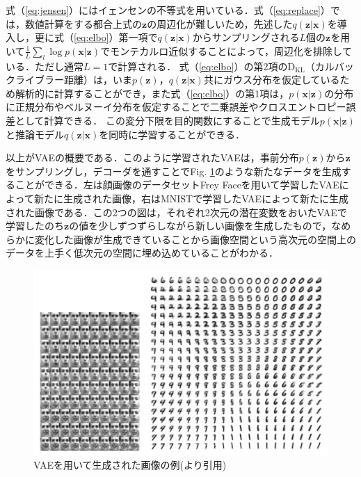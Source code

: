式（\ref{eq:jensen}）にはイェンセンの不等式を用いている．式（\ref{eq:replace}）では，数値計算をする都合上式の$\bm{z}$の周辺化が難しいため，先述した$q(\bm{z}|\bm{x})$を導入し，更に式（\ref{eq:elbo}）第一項で$q(\bm{z}|\bm{x})$からサンプリングされる$L$個の$\bm{z}$を用いて$\frac{1}{L} \sum_{l} \log p(\bm{x}|\bm{z})$でモンテカルロ近似することによって，周辺化を排除している．ただし通常$L=1$で計算される．
式（\ref{eq:elbo}）の第2項の$\mathrm{D_{KL}}$（カルバックライブラー距離）は，いま$p(\bm{z})$，$q(\bm{z}|\bm{x})$共にガウス分布を仮定しているため解析的に計算することができ，また式（\ref{eq:elbo}）の第1項は，$p(\bm{x}|\bm{z})$の分布に正規分布やベルヌーイ分布を仮定することで二乗誤差やクロスエントロピー誤差として計算できる．
この変分下限を目的関数にすることで生成モデル$p(\bm{x}|\bm{z})$と推論モデル$q(\bm{z}|\bm{x})$を同時に学習することができる．

\vspace{\baselineskip}
以上がVAEの概要である．このように学習されたVAEは，事前分布$p(\bm{z})$から$\bm{z}$をサンプリングし，デコーダを通すことでFig. \ref{fig:vae_example}のような新たなデータを生成することができる．左は顔画像のデータセットFrey Faceを用いて学習したVAEによって新たに生成された画像，右はMNISTで学習したVAEによって新たに生成された画像である．この2つの図は，それぞれ2次元の潜在変数をおいたVAEで学習したのち$\bm{z}$の値を少しずつずらしながら新しい画像を生成したもので，なめらかに変化した画像が生成できていることから画像空間という高次元の空間上のデータを上手く低次元の空間に埋め込めていることがわかる．

\begin{figure}[tbp]
  \begin{center}
    \includegraphics[width=\linewidth]{./figures/vae.png}
    \caption[VAEを用いて生成された画像の例]{VAEを用いて生成された画像の例(\cite{kingma2013autoencoding}より引用)}
    \label{fig:vae_example}
  \end{center}
\end{figure}

